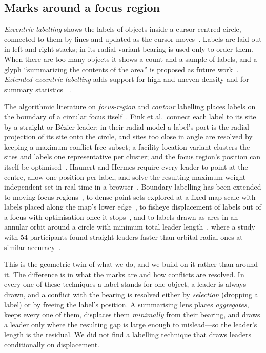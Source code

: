 \subsection{Marks around a focus region}

\emph{Excentric labelling} shows the labels of objects inside a cursor-centred
circle, connected to them by lines and updated as the cursor
moves~\cite{fekete1999excentric}. Labels are laid out in left and right stacks;
in its radial variant bearing is used only to order them. When there are too
many objects it shows a count and a sample of labels, and a glyph ``summarizing
the contents of the area'' is proposed as future work~\cite{fekete1999excentric}.
\emph{Extended excentric labelling} adds support for high and uneven density and
for summary statistics~\cite{bertini2009extended}
.

The algorithmic literature on \emph{focus-region} and \emph{contour} labelling
places labels on the boundary of a circular focus
itself~\cite{fink2012focus,bekos2019external}. Fink et al.\ connect each label
to its site by a straight or Bézier leader; in their radial model a label's port
is the radial projection of its site onto the circle, and sites too close in
angle are resolved by keeping a maximum conflict-free subset; a facility-location
variant clusters the sites and labels one representative per cluster; and the
focus region's position can itself be optimised~\cite{fink2012focus}. Haunert and
Hermes require every leader to point at the centre, allow one position per
label, and solve the resulting maximum-weight independent set in real time in a
browser~\cite{haunert2014labeling}. Boundary labelling has been extended to
moving focus regions~\cite{heinsohn2014boundary}, to dense point sets explored
at a fixed map scale with labels placed along the map's lower
edge~\cite{gedicke2021zoomless}, to fisheye displacement of labels
out of a focus with optimisation once it stops~\cite{niedermann2019focus}, and to
labels drawn as arcs in an annular orbit around a circle with minimum total
leader length~\cite{bonerath2024orbital}, where a study with 54 participants found
straight leaders faster than orbital-radial ones at similar
accuracy~\cite{wallinger2026clarity}.

This is the geometric twin of what we do, and we build on it rather than around
it. The difference is in what the marks are and how conflicts are resolved. In
every one of these techniques a label stands for one object, a leader is always
drawn, and a conflict with the bearing is resolved either by \emph{selection}
(dropping a label) or by freeing the label's position. A summarising lens
places \emph{aggregates}, keeps every one of them, displaces them
\emph{minimally} from their bearing, and draws a leader only where the
resulting gap is large enough to mislead---so the leader's length is the
residual. We did not find a labelling technique that draws leaders conditionally
on displacement.

